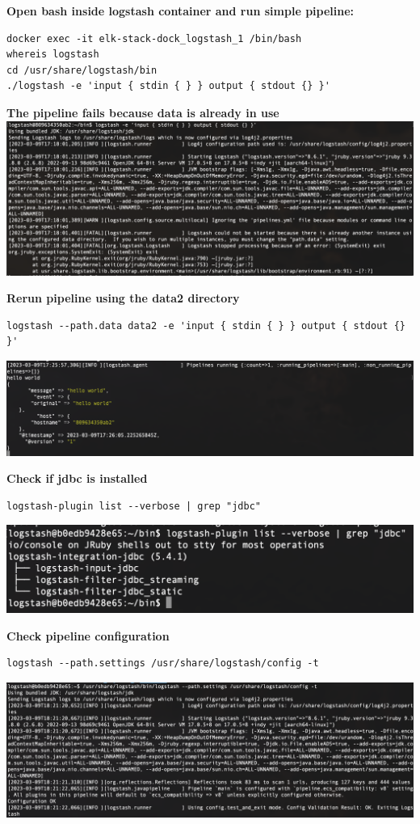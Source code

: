 \documentclass[14pt,a4paper]{extarticle}
\begin{document}
	\noindent \textbf{Open bash inside logstash container and run simple pipeline:}
	\begin{lstlisting}[style=fish]
docker exec -it elk-stack-dock_logstash_1 /bin/bash
whereis logstash
cd /usr/share/logstash/bin
./logstash -e 'input { stdin { } } output { stdout {} }'
	\end{lstlisting}
	\noindent \textbf{The pipeline fails because data is already in use} \\
	\includegraphics[width=\textwidth]{images/sc01.png} 

	\noindent \textbf{Rerun pipeline using the data2 directory}
	\begin{lstlisting}[style=fish]
logstash --path.data data2 -e 'input { stdin { } } output { stdout {} }'
	\end{lstlisting}
	\includegraphics[width=\textwidth]{images/sc02.png} 
	\newpage

	\noindent \textbf{Check if jdbc is installed} 
	\begin{lstlisting}[style=fish]
logstash-plugin list --verbose | grep "jdbc"
	\end{lstlisting}
	\includegraphics[width=\textwidth]{images/sc03.png} 

	\noindent \textbf{Check pipeline configuration} 
	\begin{lstlisting}[style=fish]
logstash --path.settings /usr/share/logstash/config -t
	\end{lstlisting}
	\includegraphics[width=\textwidth]{images/sc04.png} 
\end{document}
